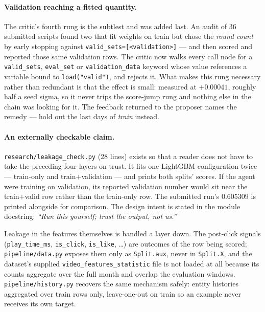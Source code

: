 \documentclass[11pt,a4paper]{article}
\newcommand{\code}[1]{\texttt{#1}}
\newcommand{\file}[1]{\texttt{#1}}
\begin{document}
\paragraph{Validation reaching a fitted quantity.} The critic's fourth rung is the subtlest and was
added last. An audit of 36 submitted scripts found two that fit weights on train but chose the
\emph{round count} by early stopping against \code{valid\_sets=[<validation>]} --- and then scored
and reported those same validation rows. The critic now walks every call node for a
\code{valid\_sets}, \code{eval\_set} or \code{validation\_data} keyword whose value references a
variable bound to \code{load("valid")}, and rejects it. What makes this rung necessary rather than
redundant is that the effect is small: measured at $+0.00041$, roughly half a seed sigma, so it
never trips the score-jump rung and nothing else in the chain was looking for it. The feedback
returned to the proposer names the remedy --- hold out the last days of \emph{train} instead.

\paragraph{An externally checkable claim.} \file{research/leakage\_check.py} (28 lines) exists so
that a reader does not have to take the preceding four layers on trust. It fits one LightGBM
configuration twice --- train-only and train+validation --- and prints both splits' scores. If the
agent were training on validation, its reported validation number would sit near the train+valid
row rather than the train-only row. The submitted run's $0.605309$ is printed alongside for
comparison. The design intent is stated in the module docstring: \emph{``Run this yourself; trust
the output, not us.''}

\medskip
\noindent
Leakage in the features themselves is handled a layer down. The post-click signals
(\code{play\_time\_ms}, \code{is\_click}, \code{is\_like}, \dots) are outcomes of the row being
scored; \file{pipeline/data.py} exposes them only as \code{Split.aux}, never in \code{Split.X},
and the dataset's supplied \file{video\_features\_statistic} file is not loaded at all because its
counts aggregate over the full month and overlap the evaluation windows.
\file{pipeline/history.py} recovers the same mechanism safely: entity histories aggregated over
train rows only, leave-one-out on train so an example never receives its own target.

\end{document}
